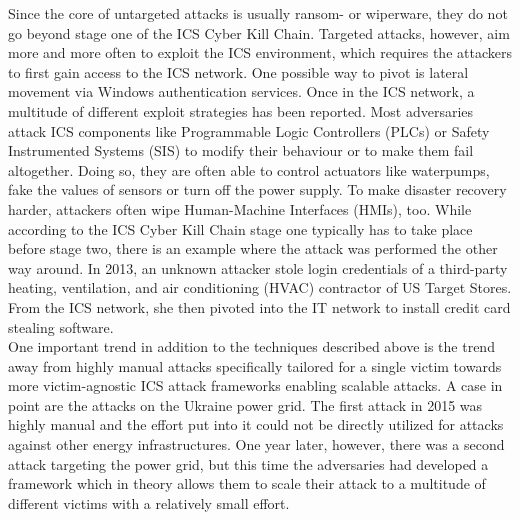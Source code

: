 \documentclass[runningheads]{llncs}
\begin{document}
Since the core of untargeted attacks is usually ransom- or wiperware, they do not go beyond stage one of the ICS Cyber Kill Chain.
Targeted attacks, however, aim more and more often to exploit the ICS environment, which requires the attackers to first gain access to the ICS network.
One possible way to pivot is lateral movement via Windows authentication services.
Once in the ICS network, a multitude of different exploit strategies has been reported.
Most adversaries attack ICS components like Programmable Logic Controllers (PLCs) or Safety Instrumented Systems (SIS) to modify their behaviour or to make them fail altogether.
Doing so, they are often able to control actuators like waterpumps, fake the values of sensors or turn off the power supply.
To make disaster recovery harder, attackers often wipe Human-Machine Interfaces (HMIs), too.
While according to the ICS Cyber Kill Chain stage one typically has to take place before stage two, there is an example where the attack was performed the other way around.
In 2013, an unknown attacker stole login credentials of a third-party heating, ventilation, and air conditioning (HVAC) contractor of US Target Stores.
From the ICS network, she then pivoted into the IT network to install credit card stealing software. \cite{hemsley.18}\\
One important trend in addition to the techniques described above is the trend away from highly manual attacks specifically tailored for a single victim towards more victim-agnostic ICS attack frameworks enabling scalable attacks.
A case in point are the attacks on the Ukraine power grid.
The first attack in 2015 was highly manual and the effort put into it could not be directly utilized for attacks against other energy infrastructures.
One year later, however, there was a second attack targeting the power grid, but this time the adversaries had developed a framework which in theory allows them to scale their attack to a multitude of different victims with a relatively small effort. \cite{greenberg.17}
\end{document}
